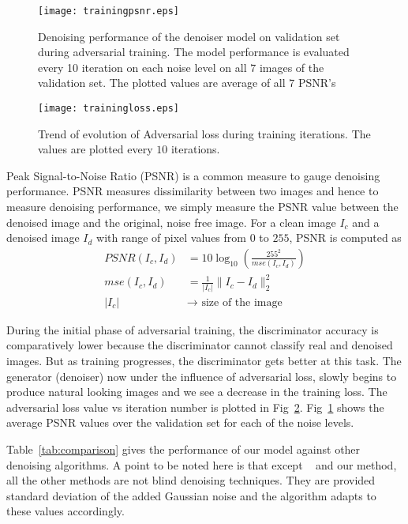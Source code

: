 \documentclass[10pt,twocolumn,letterpaper]{proc}
\begin{document}
\begin{figure}
    \centering
    \texttt{[image: trainingpsnr.eps]}
    \caption{Denoising performance of the denoiser model on validation set during adversarial training. The model performance is evaluated every 10 iteration on each noise level on all $7$ images of the validation set. The plotted values are average of all $7$ PSNR's}
    \label{fig:advValidation}
\end{figure}

\begin{figure}
    \centering
    \texttt{[image: trainingloss.eps]}
    \caption{Trend of evolution of Adversarial loss during training iterations. The values are plotted every $10$ iterations.}
    \label{fig:advTrainingError}
\end{figure}

Peak Signal-to-Noise Ratio (PSNR) is a common measure to gauge denoising performance.
PSNR measures dissimilarity between two images and hence to measure denoising performance, we simply measure the PSNR value between the denoised image and the original, noise free image.
For a clean image $I_c$ and a denoised image $I_d$ with range of pixel values from $0$ to $255$, PSNR is computed as
\begin{align}
    PSNR(I_c,I_d) &= 10\log_{10}\left(\frac{255^2}{mse(I_c,I_d)}\right)\\
    mse(I_c,I_d) &= \frac{1}{|I_c|}\|I_c-I_d\|^2_2  \\
    |I_c|&\to\text{ size of the image}
\end{align}


During the initial phase of adversarial training, the discriminator accuracy is comparatively lower because the discriminator cannot classify real and denoised images. But as training progresses, the discriminator gets better at this task. The generator (denoiser) now under the influence of adversarial loss, slowly begins to produce natural looking images and we see a decrease in the training loss. The adversarial loss value vs iteration number is plotted in Fig~\ref{fig:advTrainingError}. 
%
Fig~\ref{fig:advValidation} shows the average PSNR values over the validation set for each of the noise levels. 

Table~\ref{tab:comparison} gives the performance of our model against other denoising algorithms. A point to be noted here is that except ~\cite{Vemulapalli_2016_CVPR} and our method, all the other methods are not blind denoising techniques. They are provided standard deviation of the added Gaussian noise and the algorithm adapts to these values accordingly.
\end{document}
